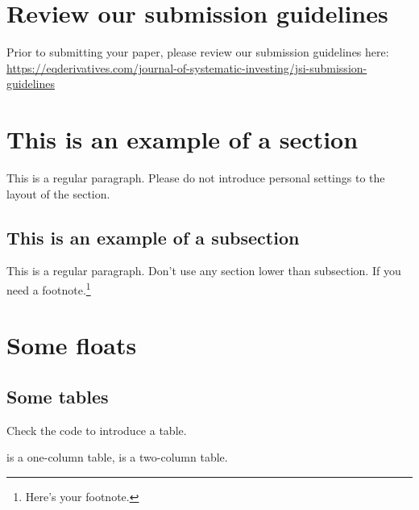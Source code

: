 \documentclass{EQDclass}
\begin{document}

\Maketitle


\section{Review our submission guidelines}

Prior to submitting your paper, please review our submission guidelines here: \url{https://eqderivatives.com/journal-of-systematic-investing/jsi-submission-guidelines}

\section{This is an example of a section}

This is a regular paragraph. Please do not introduce personal settings to the layout of the section.

\subsection{This is an example of a subsection}

This is a regular paragraph. Don't use any section lower than subsection. If you need a footnote.\footnote{Here's your footnote.}

\section{Some floats}

\subsection{Some tables}

Check the code to introduce a table.

 is a one-column table,  is a two-column table.
\end{document}
